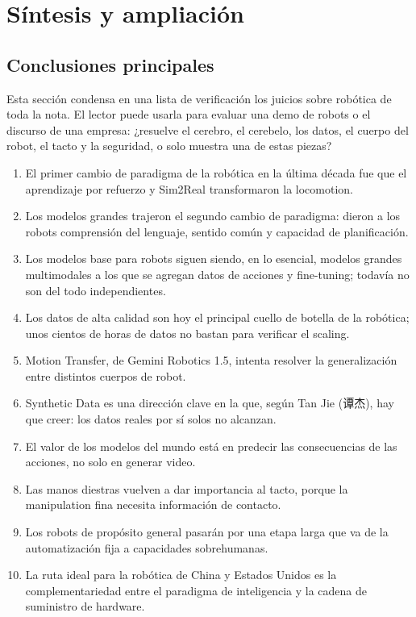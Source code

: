 \section{Síntesis y ampliación}

\subsection{Conclusiones principales}

Esta sección condensa en una lista de verificación los juicios sobre robótica de toda la nota. El lector puede usarla para evaluar una demo de robots o el discurso de una empresa: ¿resuelve el cerebro, el cerebelo, los datos, el cuerpo del robot, el tacto y la seguridad, o solo muestra una de estas piezas?

\begin{enumerate}
\item El primer cambio de paradigma de la robótica en la última década fue que el aprendizaje por refuerzo y Sim2Real transformaron la locomotion.
\item Los modelos grandes trajeron el segundo cambio de paradigma: dieron a los robots comprensión del lenguaje, sentido común y capacidad de planificación.
\item Los modelos base para robots siguen siendo, en lo esencial, modelos grandes multimodales a los que se agregan datos de acciones y fine-tuning; todavía no son del todo independientes.
\item Los datos de alta calidad son hoy el principal cuello de botella de la robótica; unos cientos de horas de datos no bastan para verificar el scaling.
\item Motion Transfer, de Gemini Robotics 1.5, intenta resolver la generalización entre distintos cuerpos de robot.
\item Synthetic Data es una dirección clave en la que, según Tan Jie (谭杰), hay que creer: los datos reales por sí solos no alcanzan.
\item El valor de los modelos del mundo está en predecir las consecuencias de las acciones, no solo en generar video.
\item Las manos diestras vuelven a dar importancia al tacto, porque la manipulation fina necesita información de contacto.
\item Los robots de propósito general pasarán por una etapa larga que va de la automatización fija a capacidades sobrehumanas.
\item La ruta ideal para la robótica de China y Estados Unidos es la complementariedad entre el paradigma de inteligencia y la cadena de suministro de hardware.
\end{enumerate}

